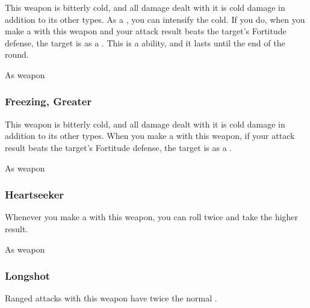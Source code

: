 This weapon is bitterly cold, and all damage dealt with it is cold damage in addition to its other types.
As a , you can intensify the cold.
If you do, when you make a  with this weapon and your attack result beats the target's Fortitude defense, the target is \fatigued as a .
This is a  ability, and it lasts until the end of the round.



 


 As weapon


\lowercase{\hypertarget{item:Freezing, Greater}{}}\label{item:Freezing, Greater}
\hypertarget{item:Freezing, Greater}{\subsubsection{Freezing, Greater\hfill{}}}

This weapon is bitterly cold, and all damage dealt with it is cold damage in addition to its other types.
When you make a  with this weapon, if your attack result beats the target's Fortitude defense, the target is \fatigued as a .



 


 As weapon


\lowercase{\hypertarget{item:Heartseeker}{}}\label{item:Heartseeker}
\hypertarget{item:Heartseeker}{\subsubsection{Heartseeker\hfill{}}}

Whenever you make a  with this weapon, you can roll twice and take the higher result.



 


 As weapon


\lowercase{\hypertarget{item:Longshot}{}}\label{item:Longshot}
\hypertarget{item:Longshot}{\subsubsection{Longshot\hfill{}}}

Ranged attacks with this weapon have twice the normal .



